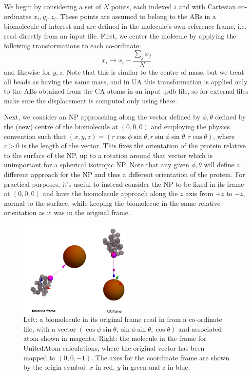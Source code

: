 \documentclass[10pt,a4paper,onecolumn]{report}
\begin{document}
We begin by considering a set of $N$ points, each indexed $i$ and with Cartesian co-ordinates $x_i,y_i,z_i$. These points are assumed to belong to the ABs in a biomolecule of interest and are defined in the molecule's own reference frame, i.e. read directly from an input file. First, we center the molecule by applying the following transformations to each co-ordinate:
\begin{equation}
x_i \rightarrow x_i - \frac{\sum_j x_j }{N}
\end{equation}
and likewise for $y,z$. Note that this is similar to the centre of mass, but we treat all beads as having the same mass, and in UA this transformation is applied only to the ABs obtained from the CA atoms in an input .pdb file, so for external files make sure the displacement is computed only using these.

Next, we consider an NP approaching along the vector defined by $\phi,\theta$ defined by the (new) centre of the biomolecule at $(0,0,0)$ and employing the physics convention such that $(x,y,z) = (r \cos \phi \sin \theta, r \sin \phi \sin \theta, r \cos \theta)$, where $r > 0$ is the length of the vector. This fixes the orientation of the protein relative to the surface of the NP, up to a rotation around that vector which is unimportant for a spherical isotropic NP. Note that any given $\phi,\theta$ will define a different approach for the NP and thus a different orientation of the protein.  For practical purposes, it's useful to instead consider the NP to be fixed in its frame at $(0,0,0)$ and have the biomolecule approach along the $z$ axis from $+z$ to $-z$, normal to the surface, while keeping the biomolecue in the same relative orientation as it was in the original frame. 

\begin{figure} \label{fig:rotation_frames}
    \centering
    \includegraphics[width=0.5\textwidth]{figures/rotation_frames.png}
    \caption{Left: a biomolecule in its original frame read in from a co-ordinate file, with a vector $(\cos \phi \sin \theta, \sin \phi \sin \theta, \cos \theta)$ and associated atom shown in magenta. Right: the molecule in the frame for UnitedAtom calculations, where the original vector has been mapped to $(0,0,-1)$. The axes for the coordinate frame are shown by the origin symbol: $x$ in red, $y$ in green and $z$ in blue. }
\end{figure}
\end{document}
